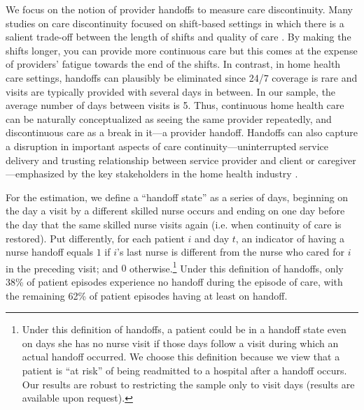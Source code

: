 \documentclass[final,12pt, notitlepage]{article}
\begin{document}
We focus on the notion of provider handoffs to measure care discontinuity. Many studies on care discontinuity focused on shift-based settings in which there is a salient trade-off between the length of shifts and quality of care \citep{Laine1993, Petersen1994, Riesenberg2009, Brachet2012}.
By making the shifts longer, you can provide more continuous care but this comes at the expense of providers' fatigue towards the end of the shifts. In contrast, in home health care settings, handoffs can plausibly be eliminated since 24/7 coverage is rare and visits are typically provided with several days in between.
In our sample, the average number of days between visits is 5.
Thus, continuous home health care can be naturally conceptualized as seeing the same provider repeatedly, and discontinuous care as a break in it---a provider handoff.
Handoffs can also capture a disruption in important aspects of care continuity---uninterrupted service delivery and trusting relationship between service provider and client or caregiver---emphasized by the key stakeholders in the home health industry \citep{Woodward2004}.

For the estimation, we define a ``handoff state'' as a series of days, beginning on the day a visit by a different skilled nurse occurs and ending on one day before the day that the same skilled nurse visits again (i.e. when continuity of care is restored). Put differently, for each patient $i$ and day $t$, an indicator of having a nurse handoff equals $1$ if $i$'s last nurse is different from the nurse who cared for $i$ in the preceding visit; and $0$ otherwise.\footnote{Under this definition of handoffs, a patient could be in a handoff state even on days she has no nurse visit if those days follow a visit during which an actual handoff occurred.  We choose this definition because we view that a patient is ``at risk'' of being readmitted to a hospital after a handoff occurs.
Our results are robust to restricting the sample only to visit days (results are available upon request).
}
Under this definition of handoffs, only 38\% of patient episodes experience no handoff during the episode of care, with the remaining 62\% of patient episodes having at least on handoff.
\end{document}
